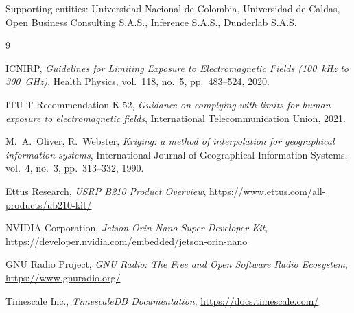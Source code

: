 \documentclass[12pt,a4paper]{article}
\begin{document}
Supporting entities: Universidad Nacional de Colombia, Universidad de Caldas, Open Business Consulting S.A.S., Inference S.A.S., Dunderlab S.A.S.

\begin{thebibliography}{9}

ICNIRP,
\textit{Guidelines for Limiting Exposure to Electromagnetic Fields (100~kHz to 300~GHz)},
Health Physics, vol.~118, no.~5, pp.~483--524, 2020.

ITU-T Recommendation K.52,
\textit{Guidance on complying with limits for human exposure to electromagnetic fields},
International Telecommunication Union, 2021.

M.~A.~Oliver, R.~Webster,
\textit{Kriging: a method of interpolation for geographical information systems},
International Journal of Geographical Information Systems, vol.~4, no.~3, pp.~313--332, 1990.

Ettus Research,
\textit{USRP B210 Product Overview},
\url{https://www.ettus.com/all-products/ub210-kit/}

NVIDIA Corporation,
\textit{Jetson Orin Nano Super Developer Kit},
\url{https://developer.nvidia.com/embedded/jetson-orin-nano}

GNU Radio Project,
\textit{GNU Radio: The Free and Open Software Radio Ecosystem},
\url{https://www.gnuradio.org/}

Timescale Inc.,
\textit{TimescaleDB Documentation},
\url{https://docs.timescale.com/}

\end{thebibliography}
\end{document}
